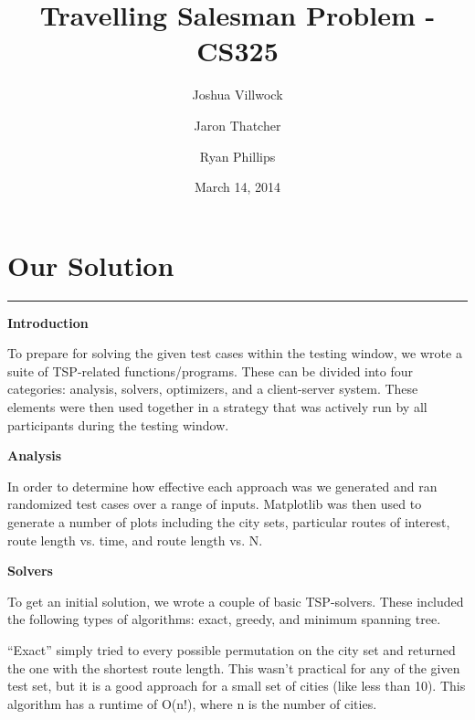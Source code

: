 \documentclass[letterpaper,10pt,titlepage,fleqn]{article}
\begin{document}
\lstset{language=Python} 

\title{Travelling Salesman Problem - CS325}

\author{
	Joshua Villwock \and
	Jaron Thatcher \and
	Ryan Phillips
}

\date{March 14, 2014}
\maketitle



\section*{Our Solution}
\hrule

\begin{Large}
\textbf{Introduction} \\
\end{Large}
To prepare for solving the given test cases within the testing window, we wrote a suite of TSP-related functions/programs. These can be divided into four categories: analysis, solvers, optimizers, and a client-server system. These elements were then used together in a strategy that was actively run by all participants during the testing window. \\

\begin{Large}
\textbf{Analysis} \\
\end{Large}
In order to determine how effective each approach was we generated and ran randomized test cases over a range of inputs. Matplotlib was then used to generate a number of plots including the city sets, particular routes of interest, route length vs. time, and route length vs. N. \\

\begin{Large}
\textbf{Solvers} \\
\end{Large}
To get an initial solution, we wrote a couple of basic TSP-solvers. These included the following types of algorithms: exact, greedy, and minimum spanning tree.

“Exact” simply tried to every possible permutation on the city set and returned the one with the shortest route length. This wasn’t practical for any of the given test set, but it is a good approach for a small set of cities (like less than 10). This algorithm has a runtime of O(n!), where n is the number of cities.
\end{document}

